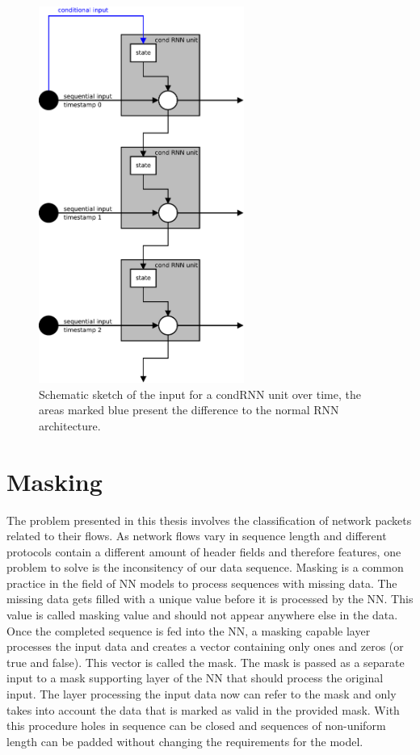 \documentclass[
	ngerman,
	ruledheaders=section,%
	class=report,%
	thesis={type=bachelor},%
	accentcolor=9c,%
	custommargins=true,%
	marginpar=false,%
	parskip=half-,%
	fontsize=11pt,%
	twoside
]{tudapub}
\begin{document}
\begin{figure}
    \includegraphics[width=0.6\textwidth]{condRNN.pdf}
    \caption{Schematic sketch of the input for a condRNN unit over time, the areas marked blue present the difference to the normal RNN architecture.}
    \label{fig:condRNN}
\end{figure}

\section{Masking}

The problem presented in this thesis involves the classification of network packets related to their flows.
As network flows vary in sequence length and different protocols contain a different amount of header fields and therefore features, one problem to solve is the inconsitency of our data sequence.
Masking is a common practice in the field of NN models to process sequences with missing data.
The missing data gets filled with a unique value before it is processed by the NN.
This value is called masking value and should not appear anywhere else in the data.
Once the completed sequence is fed into the NN, a masking capable layer processes the input data and creates a vector containing only ones and zeros (or true and false).
This vector is called the mask.
The mask is passed as a separate input to a mask supporting layer of the NN that should process the original input.
The layer processing the input data now can refer to the mask and only takes into account the data that is marked as valid in the provided mask.
With this procedure holes in sequence can be closed and sequences of non-uniform length can be padded without changing the requirements for the model. %
\end{document}
